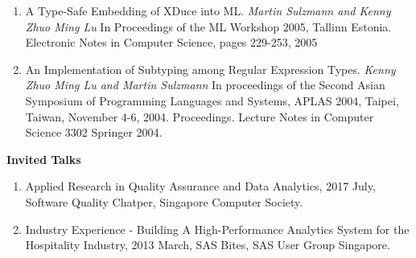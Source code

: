 \documentclass[margin,line]{res}
\newenvironment{list2}{
  \begin{list}{$\bullet$}{%
      \setlength{\itemsep}{0in}
      \setlength{\parsep}{0in} \setlength{\parskip}{0in}
      \setlength{\topsep}{0in} \setlength{\partopsep}{0in} 
      \setlength{\leftmargin}{0.2in}}}{\end{list}}
\newcommand{\longversion}[1]{}
\begin{document}
\begin{resume}
{\begin{enumerate}
In demo presentation of PLAN-X 2006, Charleston, USA, Jan 2006
\item A Type-Safe Embedding of XDuce into ML. \textit{Martin Sulzmann and Kenny Zhuo Ming Lu} In Proceedings of
the ML Workshop 2005, Tallinn Estonia. Electronic Notes in Computer Science, pages 229-253, 2005 
\item An Implementation of Subtyping among Regular Expression Types. \textit{Kenny Zhuo Ming Lu and Martin Sulzmann} In proceedings of the Second Asian Symposium of Programming Languages and Systems, APLAS 2004, Taipei, Taiwan, November 4-6, 2004. Proceedings. Lecture Notes in Computer Science 3302 Springer 2004.
\end{enumerate}


\longversion{
{\bf Technical Reports (Selected)}
\begin{enumerate}
\item A Faithful Semantics for Hindley/Milner with Regular Expression Types (Extended Version). \textit{Martin Sulzmann and Kenny Zhuo Ming Lu} 2007 July
\item Type Inference and Compilation for Parametric Regular Data Types. \textit{Martin Sulzmann and Kenny Zhuo Ming Lu} 2006
\item A Type and Semantic Preserving Translation from XDuce to ML. \textit{Martin Sulzmann and Kenny Zhuo Ming Lu 2005}
\item An Implementation of Subtyping among Regular Expression Types. \textit{Kenny Zhuo Ming Lu and Martin Sulzmann} NUS Technical Report (TRB9/04)
\item XHaskell: Regular Expression Types for Haskell. \textit{Kenny Zhuo Ming Lu, Martin Sulzmann} NUS Technical Report (TRC9/04) 
\end{enumerate}



\section{\sc Conference Presentation}
\begin{list2}
\item XHaskell: PLAN-X 2006 demo presentation (collocated with POPL 2006)
\end{list2}
}

{\bf Invited Talks}
\begin{enumerate}
 \item Applied Research in Quality Assurance and Data Analytics, 2017 July, Software Quality Chatper, Singapore Computer Society.
 \item Industry Experience - Building A High-Performance Analytics System for the Hospitality Industry, 2013 March, SAS Bites, SAS User Group Singapore.
\end{enumerate}

}
\end{resume}
\end{document}
